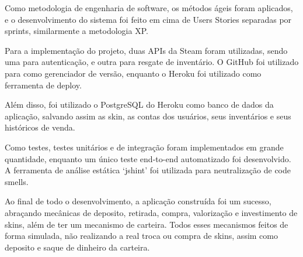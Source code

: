 \documentclass[a4paper,12pt]{article}
\begin{document}
    Como metodologia de engenharia de software, os métodos ágeis foram aplicados, e o desenvolvimento 
    do sistema foi feito em cima de Users Stories separadas por sprints, similarmente a metodologia XP.
    
    Para a implementação do projeto, duas APIs da Steam foram utilizadas, sendo uma para autenticação, 
    e outra para resgate de inventário. O GitHub foi utilizado para como gerenciador de versão, enquanto 
    o Heroku foi utilizado como ferramenta de deploy.
    
    Além disso, foi utilizado o PostgreSQL do Heroku como banco de dados da aplicação, salvando assim 
    as skin, as contas dos usuários, seus inventários e seus históricos de venda.
    
    Como testes, testes unitários e de integração foram implementados em grande quantidade, enquanto 
    um único teste end-to-end automatizado foi desenvolvido. A ferramenta de análise estática ‘jshint’ 
    foi utilizada para neutralização de code smells.
    
    Ao final de todo o desenvolvimento, a aplicação construída foi um sucesso, abraçando mecânicas de 
    deposito, retirada, compra, valorização e investimento de skins, além de ter um mecanismo de 
    carteira. Todos esses mecanismos feitos de forma simulada, não realizando a real troca ou compra 
    de skins, assim como deposito e saque de dinheiro da carteira.
\end{document}
